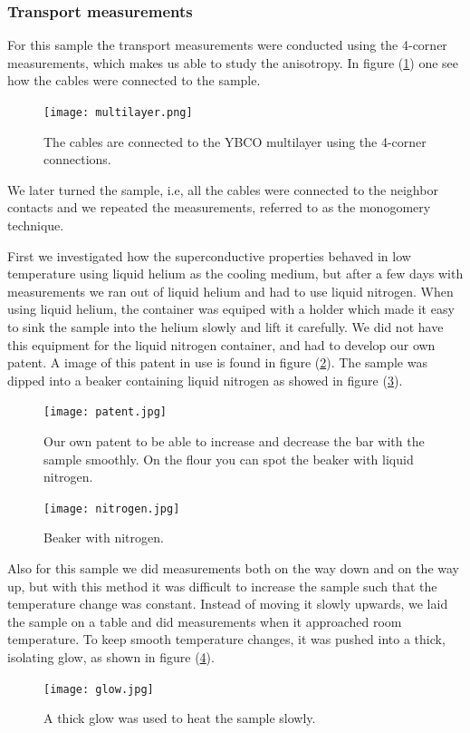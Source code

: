 \documentclass{comjnl}
\begin{document}
\subsubsection{Transport measurements}
For this sample the transport measurements were conducted using the 4-corner measurements, which makes us able to study the anisotropy. In figure (\ref{fig:multilayer}) one see how the cables were connected to the sample.
\begin{figure}[h]
\centering
\texttt{[image: multilayer.png]}
\caption{The cables are connected to the YBCO multilayer using the 4-corner connections. \label{fig:multilayer}}
\end{figure}
We later turned the sample, i.e, all the cables were connected to the neighbor contacts and we repeated the measurements, referred to as the monogomery technique. 

First we investigated how the superconductive properties behaved in low temperature using liquid helium as the cooling medium, but after a few days with measurements we ran out of liquid helium and had to use liquid nitrogen. When using liquid helium, the container was equiped with a holder which made it easy to sink the sample into the helium slowly and lift it carefully. We did not have this equipment for the liquid nitrogen container, and had to develop our own patent. A image of this patent in use is found in figure (\ref{fig:patent}). The sample was dipped into a beaker containing liquid nitrogen as showed in figure (\ref{fig:nitrogen}). 
\begin{figure}[h]
\centering
\texttt{[image: patent.jpg]}
\caption{Our own patent to be able to increase and decrease the bar with the sample smoothly. On the flour you can spot the beaker with liquid nitrogen. \label{fig:patent}}
\end{figure}
\begin{figure}[h]
\centering
\texttt{[image: nitrogen.jpg]}
\caption{Beaker with nitrogen. \label{fig:nitrogen}}
\end{figure}
Also for this sample we did measurements both on the way down and on the way up, but with this method it was difficult to increase the sample such that the temperature change was constant. Instead of moving it slowly upwards, we laid the sample on a table and did measurements when it approached room temperature. To keep smooth temperature changes, it was pushed into a thick, isolating glow, as shown in figure (\ref{fig:glow}).
\begin{figure}[h]
\centering
\texttt{[image: glow.jpg]}
\caption{A thick glow was used to heat the sample slowly. \label{fig:glow}}
\end{figure}
\end{document}

